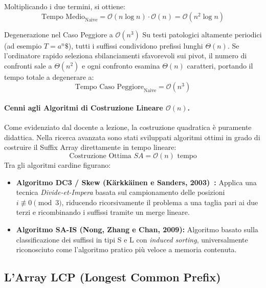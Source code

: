 Moltiplicando i due termini, si ottiene:
\begin{equation}
  \text{Tempo Medio}_{\text{Naive}} = \mathcal{O}(n \log n) \cdot \mathcal{O}(n) = \mathcal{O}(n^2 \log n)
\end{equation}

\begin{alertblock}{Degenerazione nel Caso Peggiore a $\mathcal{O}(n^3)$}
Su testi patologici altamente periodici (ad esempio $T = a^n\$$), tutti i suffissi condividono prefissi lunghi $\Theta(n)$. Se l'ordinatore rapido seleziona sbilanciamenti sfavorevoli sui pivot, il numero di confronti sale a $\Theta(n^2)$ e ogni confronto esamina $\Theta(n)$ caratteri, portando il tempo totale a degenerare a:
\begin{equation}
  \text{Tempo Caso Peggiore}_{\text{Naive}} = \mathcal{O}(n^3)
\end{equation}
\end{alertblock}

\paragraph{Cenni agli Algoritmi di Costruzione Lineare $\mathcal{O}(n)$.}
Come evidenziato dal docente a lezione, la costruzione quadratica \`e puramente didattica. Nella ricerca avanzata sono stati sviluppati algoritmi ottimi in grado di costruire il Suffix Array direttamente in tempo lineare:
\begin{equation}
  \text{Costruzione Ottima } SA = \mathcal{O}(n) \text{ tempo}
\end{equation}
Tra gli algoritmi cardine figurano:
\begin{itemize}
  \item \textbf{Algoritmo DC3 / Skew (Kärkkäinen e Sanders, 2003)~\cite{karkkainen2003}:} Applica una tecnica \textit{Divide-et-Impera} basata sul campionamento delle posizioni $i \not\equiv 0 \pmod 3$, riducendo ricorsivamente il problema a una taglia pari ai due terzi e ricombinando i suffissi tramite un merge lineare.
  \item \textbf{Algoritmo SA-IS (Nong, Zhang e Chan, 2009):} Algoritmo basato sulla classificazione dei suffissi in tipi S e L con \textit{induced sorting}, universalmente riconosciuto come l'algoritmo pratico pi\`u veloce a memoria contenuta.
\end{itemize}

\FloatBarrier
\subsection{L'Array LCP (Longest Common Prefix)}
\label{subsec:array-lcp-definizione}

